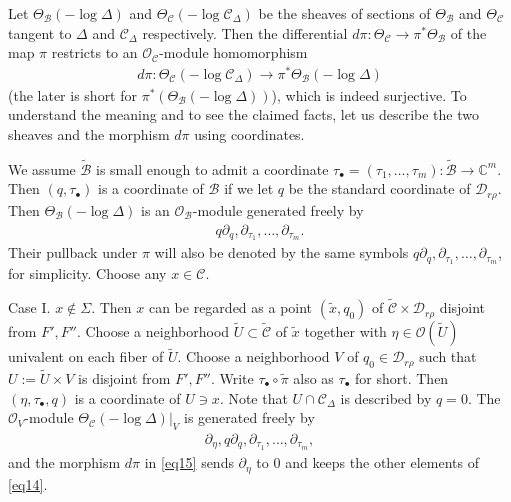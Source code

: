 \documentclass[11pt,b5paper,notitlepage]{article}
\theoremstyle{definition}
\theoremstyle{plain}
\newcommand{\mc}{\mathcal}
\newcommand{\wtd}{\widetilde}
\newcommand{\scr}{\mathscr}
\newcommand{\blt}{\bullet}
\newcommand{\Cbb}{\mathbb C}
\numberwithin{equation}{section}
\begin{document}
Let $\Theta_{\mc B}(-\log\Delta)$ and $\Theta_{\mc C}(-\log\mc C_\Delta)$ \index{zz@$\Theta_{\mc B}(-\log\Delta)$} \index{zz@$\Theta_{\mc C}(-\log\mc C_\Delta)$} be  the sheaves of sections of $\Theta_{\mc B}$ and $\Theta_{\mc C}$ tangent to $\Delta$ and $\mc C_\Delta$ respectively. Then the differential $d\pi:\Theta_{\mc C}\rightarrow\pi^*\Theta_{\mc B}$ of the map $\pi$ restricts to an $\scr O_{\mc C}$-module homomorphism
\begin{align}
d\pi:\Theta_{\mc C}(-\log\mc C_\Delta)\rightarrow \pi^*\Theta_{\mc B}(-\log\Delta)\label{eq15}
\end{align}
(the later is short for $\pi^*(\Theta_{\mc B}(-\log\Delta))$), which is indeed surjective. To understand the meaning and to see the claimed facts, let us describe the two sheaves and the morphism $d\pi$ using coordinates.

We assume $\wtd{\mc B}$ is small enough  to admit a  coordinate \index{zz@$\tau_\blt$} $\tau_\blt=(\tau_1,\dots,\tau_m):\wtd{\mc B}\rightarrow\Cbb^m$.  Then $(q,\tau_\blt)$ is a coordinate of $\mc B$ if we let $q$ be the standard coordinate of $\mc D_{r\rho}$. Then  $\Theta_{\mc B}(-\log\Delta)$ is an $\scr O_{\mc B}$-module generated freely by
\begin{align*}
q\partial_q,\partial_{\tau_1},\dots,\partial_{\tau_m}.
\end{align*}
Their pullback under $\pi$ will also be denoted by the same symbols $q\partial_q,\partial_{\tau_1},\dots,\partial_{\tau_m}$, for simplicity. Choose any $x\in\mc C$. 

Case I. $x\notin\Sigma$. Then $x$ can be regarded as a point  $(\wtd x,q_0)$ of $\wtd{\mc C}\times \mc D_{r\rho}$ disjoint from $F',F''$. Choose a neighborhood $\wtd U\subset\wtd{\mc C}$ of $\wtd x$ together with $\eta\in\scr O(\wtd U)$ univalent on each fiber of $\wtd U$. Choose a neighborhood $V$ of $q_0\in\mc D_{r\rho}$ such that $U:=\wtd U\times V$ is disjoint from $F',F''$. Write $\tau_\blt\circ\wtd\pi$ also as $\tau_\blt$ for short. Then $(\eta,\tau_\blt,q)$ is a coordinate of $U\ni x$. Note that $U\cap\mc C_\Delta$ is described by $q=0$.  The  $\scr O_V$-module $\Theta_{\mc C}(-\log\Delta)|_V$ is generated freely by
\begin{align}
\partial_\eta,q\partial_q,\partial_{\tau_1},\dots,\partial_{\tau_m},\label{eq14}
\end{align} 
and the morphism $d\pi$ in \eqref{eq15}  sends $\partial_\eta$ to $0$ and keeps the other elements of \eqref{eq14}. 
\end{document}
